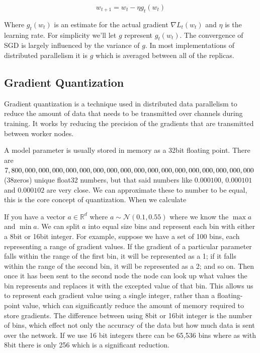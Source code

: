 \documentclass[11pt]{article}
\begin{document}
$$
w_{t+1} = w_t - \eta g_t(w_t)
$$

Where $g_t(w_t)$ is an estimate for the actual gradient ${\nabla} L_t(w_t)$ and $\eta$ is the learning rate. For simplicity we'll let $g$ represent $g_t(w_t)$. The convergence of SGD is largely influenced by the variance of $g$. In most implementations of distributed parallelism it is $g$ which is averaged between all of the replicas.


\subsection{Gradient Quantization}
Gradient quantization is a technique used in distributed data parallelism to reduce the amount of data that needs to be transmitted over channels during training. It works by reducing the precision of the gradients that are transmitted between worker nodes.

A model parameter is usually stored in memory as a 32bit floating point. There are $7, 800, 000, 000,\\ 000, 000,000,000,000,000,000,000,000,000,000,000,000,000,000$(38zeros) unique float32 numbers, but that said numbers like $0.000100$, $0.000101$ and $0.000102$ are very close. We can approximate these to number to be equal, this is the core concept of quantization. When we calculate 

If you have a vector $a \in \mathbb{R}^d$ where $a \sim \mathcal{N}(0.1,0.55)$ where we know the $\max a$ and $\min a$. We can split $a$ into equal size bins and represent each bin with either a 8bit or 16bit integer. For example, suppose we have a set of 100 bins, each representing a range of gradient values. If the gradient of a particular parameter falls within the range of the first bin, it will be represented as a 1; if it falls within the range of the second bin, it will be represented as a 2; and so on. Then once it has been sent to the second node the node can look up what values the bin represents and replaces it with the excepted value of that bin. This allows us to represent each gradient value using a single integer, rather than a floating-point value, which can significantly reduce the amount of memory required to store gradients. The difference between using 8bit or 16bit integer is the number of bins, which effect not only the accuracy of the data but how much data is sent over the network. If we use 16 bit integers there can be 65,536 bins where as with 8bit there is only 256 which is a significant reduction.
\end{document}
